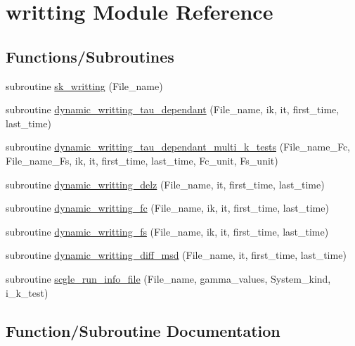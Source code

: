 \hypertarget{namespacewritting}{}\section{writting Module Reference}
\label{namespacewritting}
\subsection*{Functions/\+Subroutines}
\begin{DoxyCompactItemize}
\item 
subroutine \hyperlink{namespacewritting_ac60f4c3f240b81920461d758274edac0}{sk\+\_\+writting} (File\+\_\+name)
\item 
subroutine \hyperlink{namespacewritting_a3e320a8d95fe5b453cc9f380aeb87a68}{dynamic\+\_\+writting\+\_\+tau\+\_\+dependant} (File\+\_\+name, ik, it, first\+\_\+time, last\+\_\+time)
\item 
subroutine \hyperlink{namespacewritting_a4e9cdb11192a6b8fc7a3af6a67ce773b}{dynamic\+\_\+writting\+\_\+tau\+\_\+dependant\+\_\+multi\+\_\+k\+\_\+tests} (File\+\_\+name\+\_\+\+Fc, File\+\_\+name\+\_\+\+Fs, ik, it, first\+\_\+time, last\+\_\+time, Fc\+\_\+unit, Fs\+\_\+unit)
\item 
subroutine \hyperlink{namespacewritting_aeb136050af8a6d0d64132a6bc05590df}{dynamic\+\_\+writting\+\_\+delz} (File\+\_\+name, it, first\+\_\+time, last\+\_\+time)
\item 
subroutine \hyperlink{namespacewritting_ac706161f1529b1393a6752a62257fc5f}{dynamic\+\_\+writting\+\_\+fc} (File\+\_\+name, ik, it, first\+\_\+time, last\+\_\+time)
\item 
subroutine \hyperlink{namespacewritting_a6c54bdbe9174c5e33fe462aea3b3dbf9}{dynamic\+\_\+writting\+\_\+fs} (File\+\_\+name, ik, it, first\+\_\+time, last\+\_\+time)
\item 
subroutine \hyperlink{namespacewritting_a9228ce062a7c2c0c5362a8b0681d173d}{dynamic\+\_\+writting\+\_\+diff\+\_\+msd} (File\+\_\+name, it, first\+\_\+time, last\+\_\+time)
\item 
subroutine \hyperlink{namespacewritting_a68bba6383eed5b32fc431942d88fe477}{scgle\+\_\+run\+\_\+info\+\_\+file} (File\+\_\+name, gamma\+\_\+values, System\+\_\+kind, i\+\_\+k\+\_\+test)
\end{DoxyCompactItemize}


\subsection{Function/\+Subroutine Documentation}
